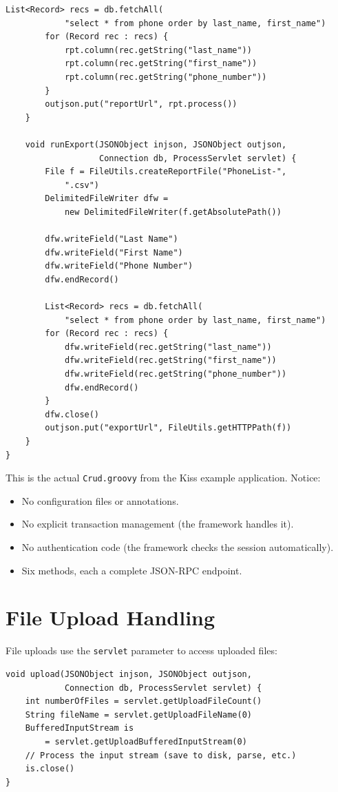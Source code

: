 \begin{lstlisting}[style=groovy]
        List<Record> recs = db.fetchAll(
            "select * from phone order by last_name, first_name")
        for (Record rec : recs) {
            rpt.column(rec.getString("last_name"))
            rpt.column(rec.getString("first_name"))
            rpt.column(rec.getString("phone_number"))
        }
        outjson.put("reportUrl", rpt.process())
    }

    void runExport(JSONObject injson, JSONObject outjson,
                   Connection db, ProcessServlet servlet) {
        File f = FileUtils.createReportFile("PhoneList-",
            ".csv")
        DelimitedFileWriter dfw =
            new DelimitedFileWriter(f.getAbsolutePath())

        dfw.writeField("Last Name")
        dfw.writeField("First Name")
        dfw.writeField("Phone Number")
        dfw.endRecord()

        List<Record> recs = db.fetchAll(
            "select * from phone order by last_name, first_name")
        for (Record rec : recs) {
            dfw.writeField(rec.getString("last_name"))
            dfw.writeField(rec.getString("first_name"))
            dfw.writeField(rec.getString("phone_number"))
            dfw.endRecord()
        }
        dfw.close()
        outjson.put("exportUrl", FileUtils.getHTTPPath(f))
    }
}
\end{lstlisting}

\begin{notebox}
This is the actual \texttt{Crud.groovy} from the Kiss example application.  Notice:
\begin{itemize}
  \item No configuration files or annotations.
  \item No explicit transaction management (the framework handles it).
  \item No authentication code (the framework checks the session automatically).
  \item Six methods, each a complete JSON-RPC endpoint.
\end{itemize}
\end{notebox}

\section{File Upload Handling}
\label{sec:svc-upload}

File uploads use the \texttt{servlet} parameter to access uploaded files:

\begin{lstlisting}[style=groovy]
void upload(JSONObject injson, JSONObject outjson,
            Connection db, ProcessServlet servlet) {
    int numberOfFiles = servlet.getUploadFileCount()
    String fileName = servlet.getUploadFileName(0)
    BufferedInputStream is
        = servlet.getUploadBufferedInputStream(0)
    // Process the input stream (save to disk, parse, etc.)
    is.close()
}
\end{lstlisting}

